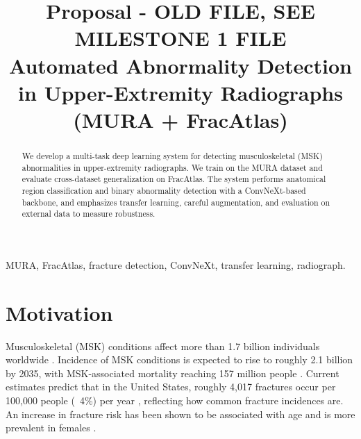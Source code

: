 \documentclass[conference]{IEEEtran}
\begin{document}
\title{Proposal - OLD FILE, SEE MILESTONE 1 FILE\\
\large{Automated Abnormality Detection in Upper-Extremity Radiographs (MURA + FracAtlas)}}

\author{
  \and
  \and
  \and
}

\maketitle

\begin{abstract}
We develop a multi-task deep learning system for detecting musculoskeletal (MSK) abnormalities in upper-extremity radiographs. We train on the MURA dataset and evaluate cross-dataset generalization on FracAtlas. The system performs anatomical region classification and binary abnormality detection with a ConvNeXt-based backbone, and emphasizes transfer learning, careful augmentation, and evaluation on external data to measure robustness.
\end{abstract}

\begin{IEEEkeywords}
MURA, FracAtlas, fracture detection, ConvNeXt, transfer learning, radiograph.
\end{IEEEkeywords}

\section{Motivation}
Musculoskeletal (MSK) conditions affect more than 1.7 billion individuals worldwide \cite{ref7}. Incidence of MSK conditions is expected to rise to roughly 2.1 billion by 2035, with MSK-associated mortality reaching 157 million people \cite{ref8}. Current estimates predict that in the United States, roughly 4,017 fractures occur per 100,000 people (~4\%) per year \cite{ref9}, reflecting how common fracture incidences are. An increase in fracture risk has been shown to be associated with age and is more prevalent in females \cite{ref9}.
\end{document}
